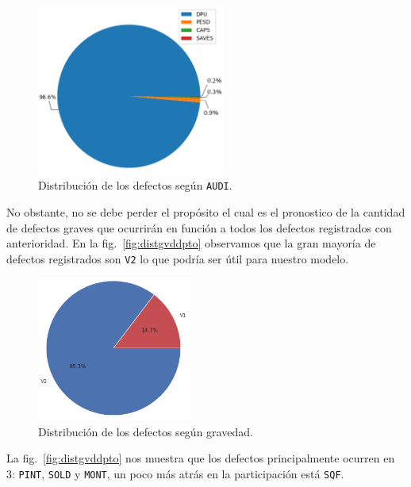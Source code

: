 \documentclass[a4paper,12pt]{article}
\begin{document}
		\begin{figure}[H]
			\begin{center}				
				\includegraphics[width=0.55\textwidth]{audidist.png}
				\caption{Distribución de los defectos según \texttt{AUDI}.}
				\label{fig:distaudi}
			\end{center}
		\end{figure}
				
		No obstante, no se debe perder el propósito el cual es el pronostico de la cantidad de defectos graves que ocurrirán en función a todos los defectos registrados con anterioridad. En la fig.~\ref{fig:distgvddpto} observamos que la gran mayoría de defectos registrados son \texttt{V2} lo que podría ser útil para nuestro modelo.
				
		\begin{figure}[H]
			\begin{center}				
				\includegraphics[width=0.45\textwidth]{tesis_51.png}
				\caption{Distribución de los defectos según gravedad.}
				\label{fig:distgvd}
			\end{center}
		\end{figure}
				
		La fig.~\ref{fig:distgvddpto} nos muestra que los defectos principalmente ocurren en 3: \texttt{PINT}, \texttt{SOLD} y \texttt{MONT}, un poco más atrás en la participación está \texttt{SQF}.
				
\end{document}
